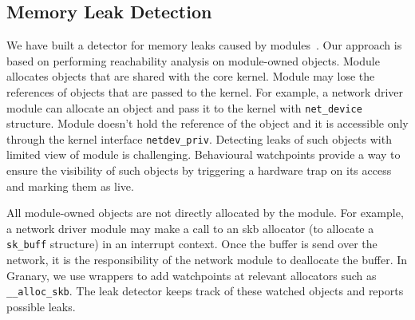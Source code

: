 \documentclass[letterpaper,twocolumn,10pt]{article}
\begin{document}
\subsection{Memory Leak Detection\label{sec:memory_leaks}}
We have built a detector for memory leaks caused by modules~\cite{Boehm96simplegarbage-collector-safety}. Our approach is based on performing reachability analysis on module-owned objects. %
Module allocates objects that are shared with the core kernel. Module may lose the references of objects that are passed to the kernel. For example, a network driver module can allocate an object and pass it to the kernel with \texttt{net\_device} structure. Module doesn't hold the reference of the object and it is accessible only through the kernel interface \texttt{netdev\_priv}. Detecting leaks of such objects with limited view of module is challenging. Behavioural watchpoints provide a way to ensure the visibility of such objects by triggering a hardware trap on its access and marking them as live.





All module-owned objects are not directly allocated by the module. For example, a network driver module may make a call to an skb allocator (to allocate a \texttt{sk\_buff} structure) in an interrupt context. Once the buffer is send over the network, it is the responsibility of the network module to deallocate the buffer. In Granary, we use wrappers to add watchpoints at relevant allocators such as \texttt{\_\_alloc\_skb}. The leak detector keeps track of these watched objects and reports possible leaks. 

\end{document}
